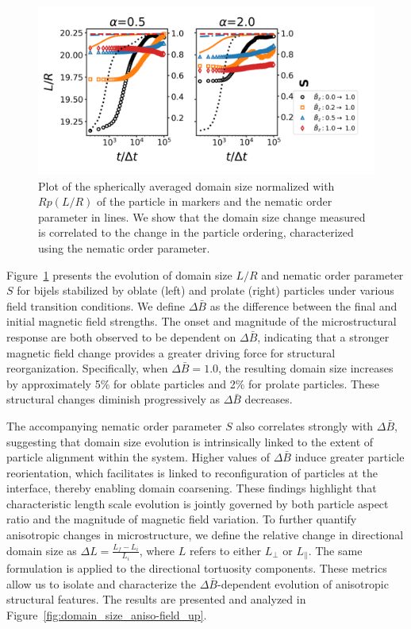 \begin{figure} 
\centering 
\includegraphics[scale=0.6]{../figures/results/paper2/domain_size-field_up.png} 
\caption{Plot of the spherically averaged domain size normalized with $Rp(L/R)$ of the particle in markers and the nematic order parameter in lines. 
         We show that the domain size change measured is correlated to the change in the particle ordering, characterized using the nematic order parameter.} 
\label{fig:domain_size-field_up} 
\end{figure}

Figure~\ref{fig:domain_size-field_up} presents the evolution of domain size \(L/R\) and nematic order parameter \(S\) for bijels stabilized by oblate (left) 
and prolate (right) particles under various field transition conditions. We define \(\Delta \bar{B}\) as the difference between the final and initial magnetic 
field strengths. The onset and magnitude of the microstructural response are both observed to be dependent on \(\Delta \bar{B}\), indicating that a stronger 
magnetic field change provides a greater driving force for structural reorganization. Specifically, when \(\Delta \bar{B} = 1.0\), the resulting domain size 
increases by approximately 5\% for oblate particles and 2\% for prolate particles. These structural changes diminish progressively as \(\Delta \bar{B}\) decreases.

The accompanying nematic order parameter \(S\) also correlates strongly with \(\Delta \bar{B}\), suggesting that domain size evolution is intrinsically linked 
to the extent of particle alignment within the system. Higher values of \(\Delta \bar{B}\) induce greater particle reorientation, which facilitates is linked to
reconfiguration of particles at the interface, thereby enabling domain coarsening. These findings highlight that characteristic length scale evolution is jointly 
governed by both particle aspect ratio and the magnitude of magnetic field variation. To further quantify anisotropic changes in microstructure, we define the 
relative change in directional domain size as \(\Delta L = \frac{L_f - L_i}{L_i}\), where \(L\) refers to either \(L_{\perp}\) or \(L_{\parallel}\). 
The same formulation is applied to the directional tortuosity components. These metrics allow us to isolate and characterize the \(\Delta \bar{B}\)-dependent 
evolution of anisotropic structural features. The results are presented and analyzed in Figure~\ref{fig:domain_size_aniso-field_up}.

